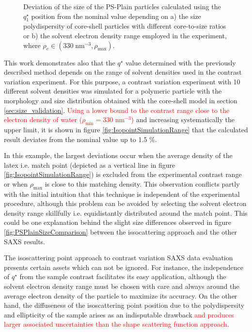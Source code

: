 \begin{figure*}%
	\centering
		\qquad
	\caption[Deviation of the size of the PS-Plain particles obtained with $q_1^{\star}$ from the nominal value.]{Deviation of the size of the PS-Plain particles calculated using the $q_1^{\star}$ position from the nominal value depending on a) the size polydispersity of core-shell particles with different core-to-size ratios or b) the solvent electron density range employed in the experiment, where  $\rho_e \in (330\;\mbox{nm}^{-3}, \rho_{\text{max}})$.}

\end{figure*}

This work demonstrates also that the $q^{\star}$ value determined with the previously described method depends on the range of solvent densities used in the contrast variation experiment. For this purpose,  a contrast variation experiment with 10 different solvent densities was simulated for a polymeric particle with the morphology and size distribution obtained with the core-shell model in section \ref{sec:size_validation}. \textcolor{red}{Using a lower bound to the contrast range close to the electron density of water ($\rho_{\text{min}}=330$ nm$^{-3}$)} and increasing systematically the upper limit, it is shown in figure \ref{fig:IsopointSimulationRange} that the calculated result deviates from the nominal value up to 1.5 $\%$.

In this example, the largest deviations occur when the average density of the latex i.e. match point (depicted as a vertical line in figure \ref{fig:IsopointSimulationRange}) is excluded from the experimental contrast range or when $\rho_{\text{max}}$ is close to this matching density. This observation conflicts partly with the initial intuition that this technique is independent of the experimental procedure, although this problem can be avoided by selecting the solvent electron density range skillfully i.e. equidistantly distributed around the match point. This could be one explanation behind the slight size differences observed in figure \ref{fig:PSPlainSizeComparison} between the issocattering approach and the other SAXS results.

The isoscattering point approach to contrast variation SAXS data evaluation presents certain assets which can not be ignored. For instance, the independence of $q^{\star}$ from the sample contrast facilitates its easy application, although the solvent electron density range must be chosen with care and always around the average electron density of the particle to maximize its accuracy. On the other hand, the diffuseness of the isoscattering point position due to the polydispersity and ellipticity of the sample arises as an indisputable drawback \textcolor{red}{and produces larger associated uncertainties than the shape scattering function approach}.

